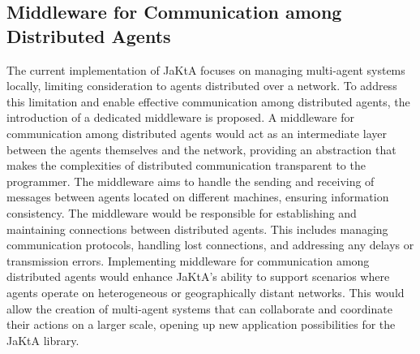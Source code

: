 \subsection{Middleware for Communication among Distributed Agents}

The current implementation of JaKtA focuses on managing multi-agent systems locally, limiting consideration to agents distributed over a network. To address this limitation and enable effective communication among distributed agents, the introduction of a dedicated middleware is proposed.
A middleware for communication among distributed agents would act as an intermediate layer between the agents themselves and the network, providing an abstraction that makes the complexities of distributed communication transparent to the programmer. The middleware aims to handle the sending and receiving of messages between agents located on different machines, ensuring information consistency.
The middleware would be responsible for establishing and maintaining connections between distributed agents. This includes managing communication protocols, handling lost connections, and addressing any delays or transmission errors.
Implementing middleware for communication among distributed agents would enhance JaKtA's ability to support scenarios where agents operate on heterogeneous or geographically distant networks. This would allow the creation of multi-agent systems that can collaborate and coordinate their actions on a larger scale, opening up new application possibilities for the JaKtA library.
